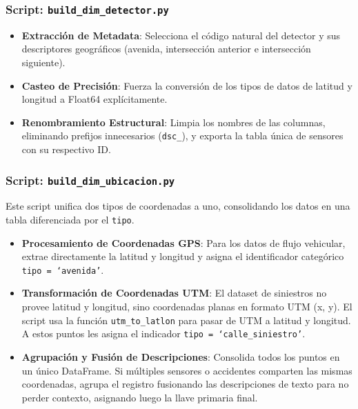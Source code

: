 \subsubsection*{Script: \texttt{build\_dim\_detector.py}}
\begin{itemize}[noitemsep]
    \item \textbf{Extracción de Metadata}:
        Selecciona el código natural del detector y sus descriptores geográficos
        (avenida, intersección anterior e intersección siguiente).
    \item \textbf{Casteo de Precisión}:
        Fuerza la conversión de los tipos de datos de latitud y longitud a
        Float64 explícitamente.
    \item \textbf{Renombramiento Estructural}:
        Limpia los nombres de las columnas, eliminando prefijos innecesarios 
        (\texttt{dsc\_}), y exporta la tabla única de sensores con su 
        respectivo ID.
\end{itemize}

\subsubsection*{Script: \texttt{build\_dim\_ubicacion.py}}

Este script unifica dos tipos de coordenadas a uno, consolidando los datos en
una tabla diferenciada por el \texttt{tipo}.
\begin{itemize}[noitemsep]
    \item \textbf{Procesamiento de Coordenadas GPS}: 
        Para los datos de flujo vehicular, extrae directamente la latitud y
        longitud y asigna el identificador categórico \texttt{tipo = `avenida'}.
    \item \textbf{Transformación de Coordenadas UTM}:
        El dataset de siniestros no provee latitud y longitud, sino coordenadas
        planas en formato UTM (x, y). 
        El script usa la funci\'on \texttt{utm\_to\_latlon} para pasar de UTM a 
        latitud y longitud. 
        A estos puntos les asigna el indicador \texttt{tipo = `calle\_siniestro'}.
    \item \textbf{Agrupación y Fusión de Descripciones}:
        Consolida todos los puntos en un único DataFrame.
        Si múltiples sensores o accidentes comparten las mismas coordenadas, 
        agrupa el registro fusionando las descripciones de texto para no 
        perder contexto, asignando luego la llave primaria final.
\end{itemize}

